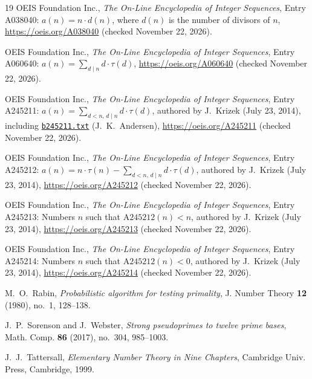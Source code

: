 \documentclass[11pt,reqno]{amsart}
\theoremstyle{plain}
\theoremstyle{definition}
\theoremstyle{remark}
\begin{document}
\begin{thebibliography}{19}
OEIS Foundation Inc., \emph{The On-Line Encyclopedia of Integer Sequences}, Entry A038040: $a(n) = n \cdot d(n)$, where $d(n)$ is the number of divisors of $n$, \url{https://oeis.org/A038040} (checked November 22, 2026).

OEIS Foundation Inc., \emph{The On-Line Encyclopedia of Integer Sequences}, Entry A060640: $a(n) = \sum_{d \mid n} d \cdot \tau(d)$, \url{https://oeis.org/A060640} (checked November 22, 2026).

OEIS Foundation Inc., \emph{The On-Line Encyclopedia of Integer Sequences}, Entry A245211: $a(n) = \sum_{d < n,\, d \mid n} d \cdot \tau(d)$, authored by J.~Krizek (July 23, 2014), including \href{https://oeis.org/A245211/b245211.txt}{\texttt{b245211.txt}} (J.~K.~Andersen), \url{https://oeis.org/A245211} (checked November 22, 2026).

OEIS Foundation Inc., \emph{The On-Line Encyclopedia of Integer Sequences}, Entry A245212: $a(n) = n \cdot \tau(n) - \sum_{d < n,\, d \mid n} d \cdot \tau(d)$, authored by J.~Krizek (July 23, 2014), \url{https://oeis.org/A245212} (checked November 22, 2026).

OEIS Foundation Inc., \emph{The On-Line Encyclopedia of Integer Sequences}, Entry A245213: Numbers $n$ such that $\text{A245212}(n) < n$, authored by J.~Krizek (July 23, 2014), \url{https://oeis.org/A245213} (checked November 22, 2026).

OEIS Foundation Inc., \emph{The On-Line Encyclopedia of Integer Sequences}, Entry A245214: Numbers $n$ such that $\text{A245212}(n) < 0$, authored by J.~Krizek (July 23, 2014), \url{https://oeis.org/A245214} (checked November 22, 2026).

M.~O.~Rabin, \emph{Probabilistic algorithm for testing primality}, J. Number Theory \textbf{12} (1980), no.~1, 128--138.

J.~P.~Sorenson and J.~Webster, \emph{Strong pseudoprimes to twelve prime bases}, Math. Comp. \textbf{86} (2017), no.~304, 985--1003.

J.~J.~Tattersall, \emph{Elementary Number Theory in Nine Chapters}, Cambridge Univ. Press, Cambridge, 1999.

\end{thebibliography}
\end{document}
